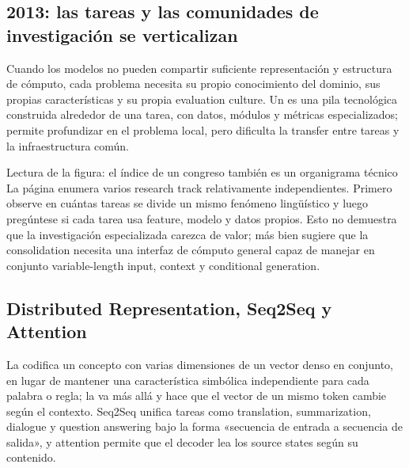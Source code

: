 
\subsection{2013: las tareas y las comunidades de investigación se verticalizan}

Cuando los modelos no pueden compartir suficiente representación y estructura de cómputo, cada problema necesita su propio conocimiento del dominio, sus propias características y su propia evaluation culture. Un  es una pila tecnológica construida alrededor de una tarea, con datos, módulos y métricas especializados; permite profundizar en el problema local, pero dificulta la transfer entre tareas y la infraestructura común.


\begin{knowledgebox}{Lectura de la figura: el índice de un congreso también es un organigrama técnico}
La página enumera varios research track relativamente independientes. Primero observe en cuántas tareas se divide un mismo fenómeno lingüístico y luego pregúntese si cada tarea usa feature, modelo y datos propios. Esto no demuestra que la investigación especializada carezca de valor; más bien sugiere que la consolidation necesita una interfaz de cómputo general capaz de manejar en conjunto variable-length input, context y conditional generation.
\end{knowledgebox}

\subsection{Distributed Representation, Seq2Seq y Attention}

La  codifica un concepto con varias dimensiones de un vector denso en conjunto, en lugar de mantener una característica simbólica independiente para cada palabra o regla; la  va más allá y hace que el vector de un mismo token cambie según el contexto. Seq2Seq unifica tareas como translation, summarization, dialogue y question answering bajo la forma «secuencia de entrada a secuencia de salida», y attention permite que el decoder lea los source states según su contenido.

